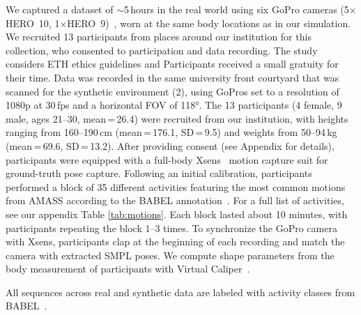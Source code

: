 We captured a dataset of $\sim$5\,hours in the real world using six GoPro cameras (5$\times$HERO~10, 1$\times$HERO~9)~\cite{GoPro}, worn at the same body locations as in our simulation.
We recruited 13 participants from places around our institution for this collection, who consented to participation and data recording.
The study considers ETH ethics guidelines and Participants received a small gratuity for their time.
Data was recorded in the same university front courtyard that was scanned for the synthetic environment (2), using GoPros set to a resolution of 1080p at 30\,fps and a horizontal FOV of 118°.
The 13 participants (4 female, 9 male, ages 21--30, mean\,=\,26.4) were recruited from our institution, with heights ranging from 160--190\,cm (mean\,=\,176.1, SD\,=\,9.5) and weights from 50--94\,kg (mean\,=\,69.6, SD\,=\,13.2).
After providing consent (see Appendix for details), participants were equipped with a full-body Xsens~\cite{XSens} motion capture suit for ground-truth pose capture.
Following an initial calibration, participants performed a block of 35 different activities featuring the most common motions from AMASS according to the BABEL annotation~\cite{punnakkalBABELBodiesAction2021jun}.
For a full list of activities, see our appendix Table \ref{tab:motions}.
Each block lasted about 10 minutes, with participants repeating the block 1--3 times. To synchronize the GoPro camera with Xsens, participants clap at the beginning of each recording and match the camera with extracted SMPL poses. We compute shape parameters from the body measurement of participants with Virtual Caliper~\cite{pujades2019virtual}.

All sequences across real and synthetic data are labeled with activity classes from BABEL~\cite{punnakkalBABELBodiesAction2021jun}.




